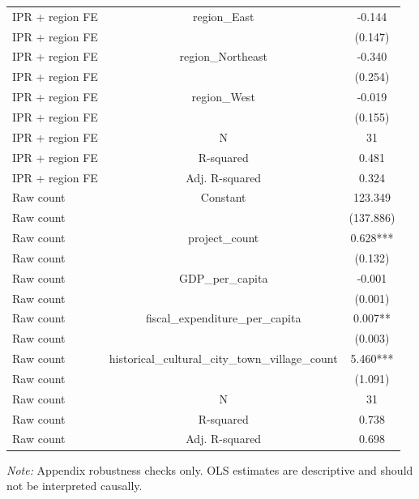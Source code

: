 \begin{table}[htbp]
{\begin{tabular}{lcc}
IPR + region FE & region\_East & -0.144 \\
IPR + region FE &  & (0.147) \\
IPR + region FE & region\_Northeast & -0.340 \\
IPR + region FE &  & (0.254) \\
IPR + region FE & region\_West & -0.019 \\
IPR + region FE &  & (0.155) \\
IPR + region FE & N & 31 \\
IPR + region FE & R-squared & 0.481 \\
IPR + region FE & Adj. R-squared & 0.324 \\
Raw count & Constant & 123.349 \\
Raw count &  & (137.886) \\
Raw count & project\_count & 0.628*** \\
Raw count &  & (0.132) \\
Raw count & GDP\_per\_capita & -0.001 \\
Raw count &  & (0.001) \\
Raw count & fiscal\_expenditure\_per\_capita & 0.007** \\
Raw count &  & (0.003) \\
Raw count & historical\_cultural\_city\_town\_village\_count & 5.460*** \\
Raw count &  & (1.091) \\
Raw count & N & 31 \\
Raw count & R-squared & 0.738 \\
Raw count & Adj. R-squared & 0.698 \\
\hline\hline
\end{tabular}
}
\begin{minipage}{0.95\textwidth}\footnotesize \textit{Note:} Appendix robustness checks only. OLS estimates are descriptive and should not be interpreted causally.\end{minipage}
\end{table}